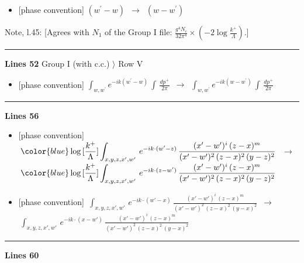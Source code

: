 \documentclass[10pt]{article}
\newenvironment{notebox}{\def\FrameCommand{{\color{notebar}\vrule width 1.5pt}\hspace{6pt}}\MakeFramed{\advance\hsize-\width\FrameRestore}\small}{\endMakeFramed}
\begin{document}
\begin{itemize}[leftmargin=2.2em,itemsep=1pt,topsep=2pt]
\item[\textbf{l.44}] \textsf{\small [phase convention]} $\displaystyle (w^\prime-w)$\ $\longrightarrow$\ $\displaystyle (w-w^\prime)$
\end{itemize}
\begin{notebox}\textsf{\small Note, l.45:} [Agrees with $N_{1}$ of the Group I file: $\frac{g^{4}N_{c}}{32\pi^{4}}\times(-2\log\frac{k^{+}}{\Lambda})$.]\end{notebox}
\noindent\rule{\linewidth}{0.3pt}\par\noindent\textbf{Lines 52} \quad \textsf{Group I (with c.c.) $\rangle$ Row V} \par
\begin{itemize}[leftmargin=2.2em,itemsep=1pt,topsep=2pt]
\item[\textbf{l.52}] \textsf{\small [phase convention]} $\displaystyle \int_{w, w^\prime} e^{-ik(w^\prime-w)}\, \int\, \frac{dp^{+}}{2\pi}$\ $\longrightarrow$\ $\displaystyle \int_{w, w^\prime} e^{-ik(w-w^\prime)}\, \int\, \frac{dp^{+}}{2\pi}$
\end{itemize}
\noindent\rule{\linewidth}{0.3pt}\par\noindent\textbf{Lines 56} \par
\begin{itemize}[leftmargin=2.2em,itemsep=1pt,topsep=2pt]
\item[\textbf{l.56}] \textsf{\small [phase convention]} $\displaystyle \,{\color{blue}\log{[\frac{k^{+}}{\Lambda}]}} \int_{x,y,z,x',w'}\, e^{-ik\cdot(w'-z)}\,\frac{(x'-w')^{i}\,(z-x)^{m}}{(x'-w')^{2}\,(z-x)^{2}\, (y-z)^{2}}\,$\ $\longrightarrow$\ $\displaystyle \,{\color{blue}\log{[\frac{k^{+}}{\Lambda}]}} \int_{x,y,z,x',w'}\, e^{-ik\cdot(z-w')}\,\frac{(x'-w')^{i}\,(z-x)^{m}}{(x'-w')^{2}\,(z-x)^{2}\, (y-z)^{2}}\,$
\item[\textbf{l.56}] \textsf{\small [phase convention]} $\displaystyle \, \int_{x,y,z,x',w'}\,e^{-ik\cdot(w'-x)}\,\frac{(x'-w')^{i}\,(z-x)^{m}}{(x'-w')^{2}\,(z-x)^{2}\,(y-x)^{2}}$\ $\longrightarrow$\ $\displaystyle \, \int_{x,y,z,x',w'}\,e^{-ik\cdot(x-w')}\,\frac{(x'-w')^{i}\,(z-x)^{m}}{(x'-w')^{2}\,(z-x)^{2}\,(y-x)^{2}}$
\end{itemize}
\noindent\rule{\linewidth}{0.3pt}\par\noindent\textbf{Lines 60} \par
\end{document}
